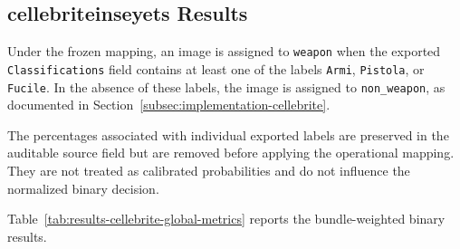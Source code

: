 \subsection{\texorpdfstring{\gls{cellebriteinseyets}}{Cellebrite Inseyets} Results}
\label{subsec:results-cellebrite}

Under the frozen mapping, an image is assigned to \texttt{weapon} when the
exported \texttt{Classifications} field contains at least one of the labels
\texttt{Armi}, \texttt{Pistola}, or \texttt{Fucile}. In the absence of these
labels, the image is assigned to \texttt{non\_weapon}, as documented in
Section~\ref{subsec:implementation-cellebrite}.

The percentages associated with individual exported labels are preserved in
the auditable source field but are removed before applying the operational
mapping. They are not treated as calibrated probabilities and do not influence
the normalized binary decision.

Table~\ref{tab:results-cellebrite-global-metrics} reports the bundle-weighted
binary results.

